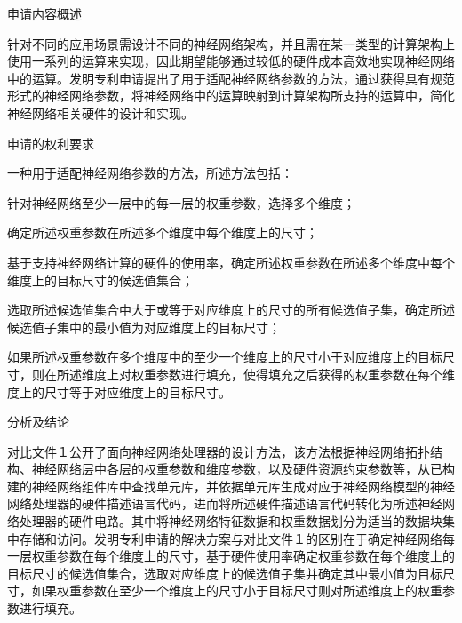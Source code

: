 {\setlength{\parindent}{20.1bp}申请内容概述\par}

{\setlength{\parindent}{20.6bp}针对不同的应用场景需设计不同的神经网络架构，并且需在某一类型的计算架构上使用一系列的运算来实现，因此期望能够通过较低的硬件成本高效地实现神经网络中的运算。发明专利申请提出了用于适配神经网络参数的方法，通过获得具有规范形式的神经网络参数，将神经网络中的运算映射到计算架构所支持的运算中，简化神经网络相关硬件的设计和实现。\par}

{\setlength{\parindent}{20.1bp}申请的权利要求\par}

{\setlength{\parindent}{20.6bp}一种用于适配神经网络参数的方法，所述方法包括：\par}

{\setlength{\parindent}{20.6bp}针对神经网络至少一层中的每一层的权重参数，选择多个维度；\par}

{\setlength{\parindent}{20.6bp}确定所述权重参数在所述多个维度中每个维度上的尺寸；\par}

{\setlength{\parindent}{20.6bp}基于支持神经网络计算的硬件的使用率，确定所述权重参数在所述多个维度中每个维度上的目标尺寸的候选值集合；\par}

{\setlength{\parindent}{20.6bp}选取所述候选值集合中大于或等于对应维度上的尺寸的所有候选值子集，确定所述候选值子集中的最小值为对应维度上的目标尺寸；\par}

{\setlength{\parindent}{20.6bp}如果所述权重参数在多个维度中的至少一个维度上的尺寸小于对应维度上的目标尺寸，则在所述维度上对权重参数进行填充，使得填充之后获得的权重参数在每个维度上的尺寸等于对应维度上的目标尺寸。\par}

{\setlength{\parindent}{20.1bp}分析及结论\par}

{\setlength{\parindent}{20.6bp}对比文件１公开了面向神经网络处理器的设计方法，该方法根据神经网络拓扑结构、神经网络层中各层的权重参数和维度参数，以及硬件资源约束参数等，从已构建的神经网络组件库中查找单元库，并依据单元库生成对应于神经网络模型的神经网络处理器的硬件描述语言代码，进而将所述硬件描述语言代码转化为所述神经网络处理器的硬件电路。其中将神经网络特征数据和权重数据划分为适当的数据块集中存储和访问。发明专利申请的解决方案与对比文件１的区别在于确定神经网络每一层权重参数在每个维度上的尺寸，基于硬件使用率确定权重参数在每个维度上的目标尺寸的候选值集合，选取对应维度上的候选值子集并确定其中最小值为目标尺寸，如果权重参数在至少一个维度上的尺寸小于目标尺寸则对所述维度上的权重参数进行填充。\par}


